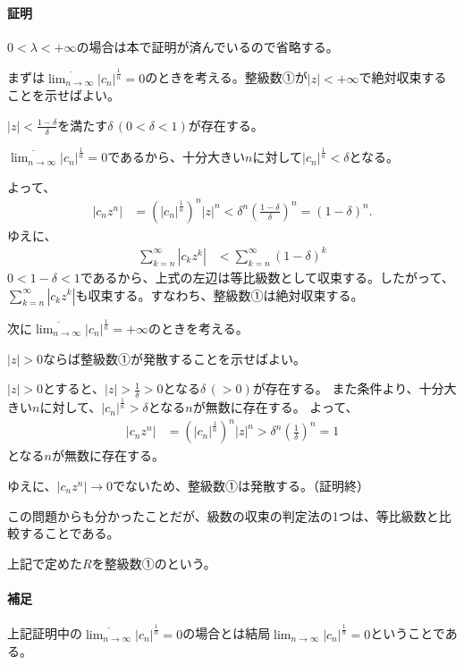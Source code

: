 \paragraph{証明}
$0<\lambda<+\infty$の場合は本で証明が済んでいるので省略する。

まずは$\displaystyle\overline{\lim_{n\to\infty}}|c_n|^{\frac{1}{n}}=0$のときを考える。整級数①が$|z|<+\infty$で絶対収束することを示せばよい。

$|z|<\frac{1-\delta}{\delta}$を満たす$\delta\,(0<\delta<1)$が存在する。

$\displaystyle\overline{\lim_{n\to\infty}}|c_n|^{\frac{1}{n}}=0$であるから、十分大きい$n$に対して$|c_n|^\frac{1}{n}<\delta$となる。

よって、
\begin{align*}
    |c_nz^n|&=\left(|c_n|^\frac{1}{n}\right)^n|z|^n<\delta^n\left(\frac{1-\delta}{\delta}\right)^n
    =(1-\delta)^n.
\end{align*}
ゆえに、
\begin{align*}
    \sum_{k=n}^\infty |c_kz^k|&<\sum_{k=n}^\infty(1-\delta)^k
\end{align*}
$0<1-\delta<1$であるから、上式の左辺は等比級数として収束する。したがって、$\sum_{k=n}^\infty |c_kz^k|$も収束する。すなわち、整級数①は絶対収束する。

次に$\displaystyle\overline{\lim_{n\to\infty}}|c_n|^{\frac{1}{n}}=+\infty$のときを考える。

$|z|>0$ならば整級数①が発散することを示せばよい。

$|z|>0$とすると、$|z|>\frac{1}{\delta}>0$となる$\delta\,(>0)$が存在する。
また条件より、十分大きい$n$に対して、$|c_n|^\frac{1}{n}>\delta$となる$n$が無数に存在する。
よって、
\begin{align*}
    |c_nz^n|&=\left(|c_n|^\frac{1}{n}\right)^n|z|^n>\delta^n\left(\frac{1}{\delta}\right)^n
    =1
\end{align*}
となる$n$が無数に存在する。

ゆえに、$|c_nz^n|\to 0$でないため、整級数①は発散する。（証明終）

この問題からも分かったことだが、級数の収束の判定法の1つは、等比級数と比較することである。

上記で定めた$R$を整級数①のという。

\paragraph{補足}
上記証明中の$\displaystyle\overline{\lim_{n\to\infty}}|c_n|^{\frac{1}{n}}=0$の場合とは結局$\displaystyle{\lim_{n\to\infty}|c_n|^{\frac{1}{n}}=0}$ということである。

